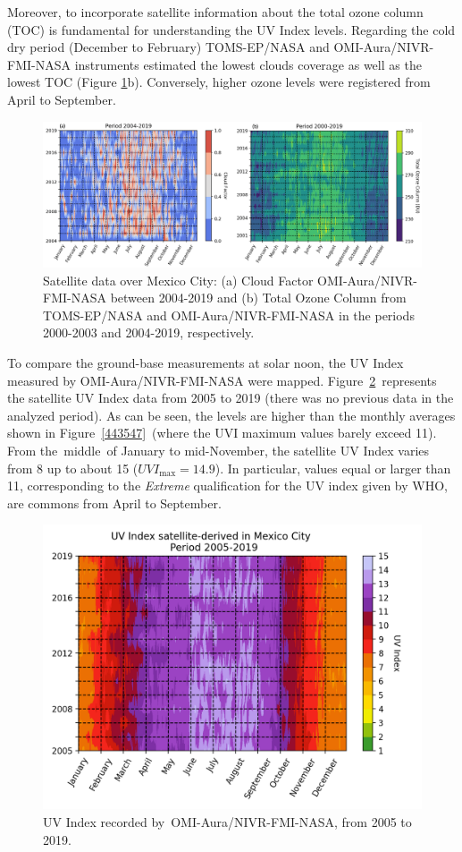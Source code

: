 \documentclass[10pt]{article}
\begin{document}
Moreover, to incorporate satellite information about the total ozone
column (TOC) is fundamental for understanding the UV Index levels.
Regarding the cold dry period (December to February) TOMS-EP/NASA and
OMI-Aura/NIVR-FMI-NASA instruments estimated the lowest clouds coverage
as well as the lowest TOC (Figure {\ref{573921}}b).
Conversely, higher ozone levels were registered from April to
September.~
\begin{figure}[H]
\begin{center}
\includegraphics[width=1.00\columnwidth]{OzonoCloudDaily}
\caption{{Satellite data over Mexico City: (a) Cloud Factor OMI-Aura/NIVR-FMI-NASA
between 2004-2019 and (b) Total Ozone Column from TOMS-EP/NASA and
OMI-Aura/NIVR-FMI-NASA in the periods 2000-2003 and 2004-2019,
respectively.
{\label{573921}}%
}}
\end{center}
\end{figure}

To compare the ground-base measurements at solar noon, the UV Index
measured by OMI-Aura/NIVR-FMI-NASA were mapped.
Figure~{\ref{674611}}~represents the satellite UV Index
data from 2005 to 2019 (there was no previous data in the analyzed
period). As can be seen, the levels are higher than the monthly averages
shown in Figure~{\ref{443547}}~(where the UVI maximum
values barely exceed 11). From the~middle~of January to mid-November,
the satellite UV Index varies from 8 up to about 15
(\(UVI_{\max}=14.9\)). In particular, values equal or larger than 11,
corresponding to the \emph{Extreme} qualification for the UV index given
by WHO, are commons from April to September.
\begin{figure}[H]
\begin{center}
\includegraphics[width=0.70\columnwidth]{UVI-OMI}
\caption{{UV Index recorded by~OMI-Aura/NIVR-FMI-NASA, from 2005 to 2019.
{\label{674611}}%
}}
\end{center}
\end{figure}
\end{document}
